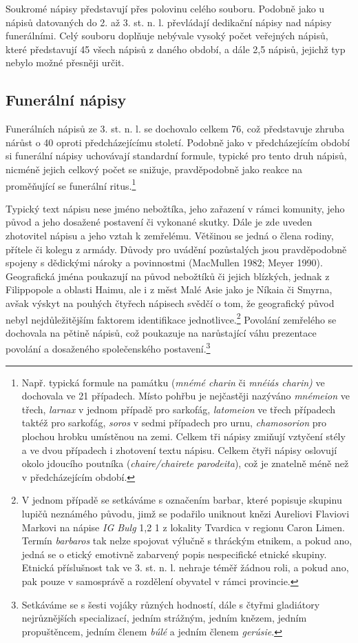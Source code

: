 Soukromé nápisy představují přes polovinu celého souboru. Podobně jako u nápisů datovaných do 2. až 3. st. n. l. převládají dedikační nápisy nad nápisy funerálními. Celý souboru doplňuje nebývale vysoký počet veřejných nápisů, které představují 45  všech nápisů z daného období, a dále 2,5  nápisů, jejichž typ nebylo možné přesněji určit.

\subsection[funerální-nápisy-15]{Funerální nápisy}

Funerálních nápisů ze 3. st. n. l. se dochovalo celkem 76, což představuje zhruba nárůst o 40  oproti předcházejícímu století. Podobně jako v předcházejícím období si funerální nápisy uchovávají standardní formule, typické pro tento druh nápisů, nicméně jejich celkový počet se snižuje, pravděpodobně jako reakce na proměňující se funerální ritus.\footnote{Např. typická formule na památku ({\em mnémé charin} či {\em mnéiás charin)} ve dochovala ve 21 případech. Místo pohřbu je nejčastěji nazýváno {\em mnémeion} ve třech, {\em larnax} v jednom případě pro sarkofág, {\em latomeion} ve třech případech taktéž pro sarkofág, {\em soros} v sedmi případech pro urnu, {\em chamosorion} pro plochou hrobku umístěnou na zemi. Celkem tři nápisy zmiňují vztyčení stély a ve dvou případech i zhotovení textu nápisu. Celkem čtyři nápisy oslovují okolo jdoucího poutníka ({\em chaire/chairete parodeita}), což je znatelně méně než v předcházejícím období.}

Typický text nápisu nese jméno nebožtíka, jeho zařazení v rámci komunity, jeho původ a jeho dosažené postavení či vykonané skutky. Dále je zde uveden zhotovitel nápisu a jeho vztah k zemřelému. Většinou se jedná o člena rodiny, přítele či kolegu z armády. Důvody pro uvádění pozůstalých jsou pravděpodobně spojeny s dědickými nároky a povinnostmi (MacMullen 1982; Meyer 1990). Geografická jména poukazují na původ nebožtíků či jejich blízkých, jednak z Filippopole a oblasti Haimu, ale i z měst Malé Asie jako je Níkaia či Smyrna, avšak výskyt na pouhých čtyřech nápisech svědčí o tom, že geografický původ nebyl nejdůležitějším faktorem identifikace jednotlivce.\footnote{V jednom případě se setkáváme s označením barbar, které popisuje skupinu lupičů neznámého původu, jimž se podařilo uniknout knězi Aureliovi Flaviovi Markovi na nápise {\em IG Bulg} 1,2 1 z lokality Tvardica v regionu Caron Limen. Termín {\em barbaros} tak nelze spojovat výlučně s thráckým etnikem, a pokud ano, jedná se o etický emotivně zabarvený popis nespecifické etnické skupiny. Etnická příslušnost tak ve 3. st. n. l. nehraje téměř žádnou roli, a pokud ano, pak pouze v samosprávě a rozdělení obyvatel v rámci provincie.} Povolání zemřelého se dochovala na pětině nápisů, což poukazuje na narůstající váhu prezentace povolání a dosaženého společenského postavení.\footnote{Setkáváme se s šesti vojáky různých hodností, dále s čtyřmi gladiátory nejrůznějších specializací, jedním strážným, jedním knězem, jedním propuštěncem, jedním členem {\em búlé} a jedním členem {\em gerúsie}.}

